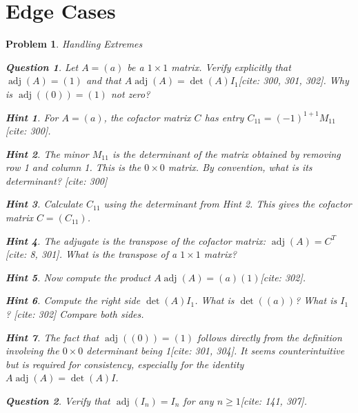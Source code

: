 \documentclass[12pt]{article}
\newtheorem{problem}{Problem}[section]
\newtheorem{question}{Question}[problem]
\theoremstyle{definition}
\newtheorem{hint}{Hint}[question]
\newcommand{\adj}{\operatorname{adj}}
\newcommand{\detm}{\operatorname{det}}
\begin{document}
\section{Edge Cases}

\begin{problem}{Handling Extremes}
    \begin{question}
        Let $A = (a)$ be a $1 \times 1$ matrix. Verify explicitly that $\adj(A)=(1)$ and that $A \adj(A) = \detm(A) I_1$[cite: 300, 301, 302]. Why is $\adj((0))=(1)$ not zero?
    \end{question}
    
        \begin{hint}
            For $A=(a)$, the cofactor matrix $C$ has entry $C_{11} = (-1)^{1+1} M_{11}$[cite: 300].
        \end{hint}
        \begin{hint}
            The minor $M_{11}$ is the determinant of the matrix obtained by removing row 1 and column 1. This is the $0 \times 0$ matrix. By convention, what is its determinant? [cite: 300]
        \end{hint}
        \begin{hint}
            Calculate $C_{11}$ using the determinant from Hint 2. This gives the cofactor matrix $C=(C_{11})$.
        \end{hint}
        \begin{hint}
            The adjugate is the transpose of the cofactor matrix: $\adj(A) = C^T$[cite: 8, 301]. What is the transpose of a $1 \times 1$ matrix?
        \end{hint}
        \begin{hint}
            Now compute the product $A \adj(A) = (a)(1)$[cite: 302].
        \end{hint}
         \begin{hint}
             Compute the right side $\detm(A) I_1$. What is $\detm((a))$? What is $I_1$? [cite: 302] Compare both sides.
         \end{hint}
         \begin{hint}
             The fact that $\adj((0))=(1)$ follows directly from the definition involving the $0 \times 0$ determinant being 1[cite: 301, 304]. It seems counterintuitive but is required for consistency, especially for the identity $A \adj(A) = \detm(A) I$.
         \end{hint}
    

    \begin{question}
        Verify that $\adj(I_n) = I_n$ for any $n \ge 1$[cite: 141, 307].
    \end{question}
    

\end{problem}
\end{document}
